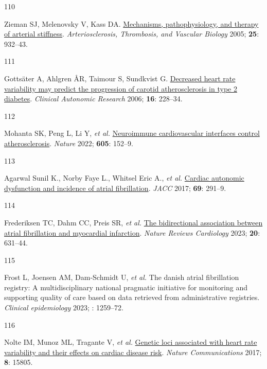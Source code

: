 \documentclass[
  letterpaper,
  headsepline=true,
  open=any]{scrbook}
\newlength{\cslhangindent}
\newlength{\csllabelwidth}
\newlength{\cslentryspacingunit} %
\newenvironment{CSLReferences}[2] %
 {%
  \setlength{\parindent}{0pt}
  \ifodd #1
  \let\oldpar\par
  \def\par{\hangindent=\cslhangindent\oldpar}
  \fi
  \setlength{\parskip}{#2\cslentryspacingunit}
 }%
 {}
\newcommand{\CSLLeftMargin}[1]{\parbox[t]{\csllabelwidth}{#1}}
\newcommand{\CSLRightInline}[1]{\parbox[t]{\linewidth - \csllabelwidth}{#1}\break}
\begin{document}
\begin{CSLReferences}{0}{0}
\leavevmode{}%
\CSLLeftMargin{110 }%
\CSLRightInline{Zieman SJ, Melenovsky V, Kass DA.
\href{https://doi.org/10.1161/01.ATV.0000160548.78317.29}{Mechanisms,
pathophysiology, and therapy of arterial stiffness}.
\emph{Arteriosclerosis, Thrombosis, and Vascular Biology} 2005;
\textbf{25}: 932--43.}

\leavevmode{}%
\CSLLeftMargin{111 }%
\CSLRightInline{Gottsäter A, Ahlgren ÅR, Taimour S, Sundkvist G.
\href{https://doi.org/10.1007/s10286-006-0345-4}{Decreased heart rate
variability may predict the progression of carotid atherosclerosis in
type 2 diabetes}. \emph{Clinical Autonomic Research} 2006; \textbf{16}:
228--34.}

\leavevmode{}%
\CSLLeftMargin{112 }%
\CSLRightInline{Mohanta SK, Peng L, Li Y, \emph{et al.}
\href{https://doi.org/10.1038/s41586-022-04673-6}{Neuroimmune
cardiovascular interfaces control atherosclerosis}. \emph{Nature} 2022;
\textbf{605}: 152--9.}

\leavevmode{}%
\CSLLeftMargin{113 }%
\CSLRightInline{Agarwal Sunil K., Norby Faye L., Whitsel Eric A.,
\emph{et al.} \href{https://doi.org/10.1016/j.jacc.2016.10.059}{Cardiac
autonomic dysfunction and incidence of atrial fibrillation}. \emph{JACC}
2017; \textbf{69}: 291--9.}

\leavevmode{}%
\CSLLeftMargin{114 }%
\CSLRightInline{Frederiksen TC, Dahm CC, Preis SR, \emph{et al.}
\href{https://doi.org/10.1038/s41569-023-00857-3}{The bidirectional
association between atrial fibrillation and myocardial infarction}.
\emph{Nature Reviews Cardiology} 2023; \textbf{20}: 631--44.}

\leavevmode{}%
\CSLLeftMargin{115 }%
\CSLRightInline{Frost L, Joensen AM, Dam-Schmidt U, \emph{et al.} The
danish atrial fibrillation registry: A multidisciplinary national
pragmatic initiative for monitoring and supporting quality of care based
on data retrieved from administrative registries. \emph{Clinical
epidemiology} 2023; : 1259--72.}

\leavevmode{}%
\CSLLeftMargin{116 }%
\CSLRightInline{Nolte IM, Munoz ML, Tragante V, \emph{et al.}
\href{https://doi.org/10.1038/ncomms15805}{Genetic loci associated with
heart rate variability and their effects on cardiac disease risk}.
\emph{Nature Communications} 2017; \textbf{8}: 15805.}


\end{CSLReferences}
\end{document}
